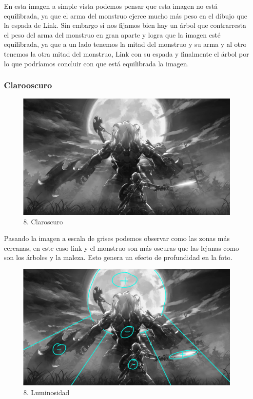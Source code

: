 \documentclass[12pt]{article}
\begin{document}
En esta imagen a simple vista podemos pensar que esta imagen no está equilibrada, ya que el arma del monstruo ejerce mucho más peso en el dibujo que la espada de Link. Sin embargo si nos fijamos bien hay un árbol que contrarresta el peso del arma del monstruo en gran aparte y logra que la imagen esté equilibrada, ya que a un lado tenemos la mitad del monstruo y su arma y al otro tenemos la otra mitad del monstruo, Link con su espada y finalmente el árbol por lo que podríamos concluir con que está equilibrada la imagen. 


        \subsubsection{Clarooscuro}

\begin{figure}[H]
      \centering
      \includegraphics[scale=0.25]{images/Raúl/Sección 8/Imagen 8 gris.jpg}
      \caption{\small 8. Claroscuro}
    \end{figure}

 Pasando la imagen a escala de grises podemos observar como las zonas más cercanas, en este caso link y el monstruo son más oscuras que las lejanas como son los árboles y la maleza. Esto genera un efecto de profundidad en la foto.

\begin{figure}[H]
      \centering
      \includegraphics[scale=0.25]{images/Raúl/Sección 8/Imagen 8 gris lumin.jpg}
      \caption{\small 8. Luminosidad}
    \end{figure}
\end{document}
